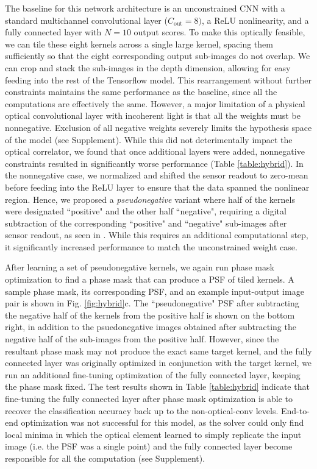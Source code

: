 \documentclass[fleqn,10pt]{wlscirep}
\begin{document}
The baseline for this network architecture is an unconstrained CNN with a standard multichannel convolutional layer ($C_\text{out} = 8)$, a ReLU nonlinearity, and a fully connected layer with $N=10$ output scores. To make this optically feasible, we can tile these eight kernels across a single large kernel, spacing them sufficiently so that the eight corresponding output sub-images do not overlap. We can crop and stack the sub-images in the depth dimension, allowing for easy feeding into the rest of the Tensorflow model. This rearrangement without further constraints maintains the same performance as the baseline, since all the computations are effectively the same. However, a major limitation of a physical optical convolutional layer with incoherent light is that all the weights must be nonnegative. Exclusion of all negative weights severely limits the hypothesis space of the model (see Supplement). While this did not deterimentally impact the optical correlator, we found that once additional layers were added, nonnegative constraints resulted in significantly worse performance (Table \ref{table:hybrid}). In the nonnegative case, we normalized and shifted the sensor readout to zero-mean before feeding into the ReLU layer to ensure that the data spanned the nonlinear region. Hence, we proposed a \textit{pseudonegative} variant where half of the kernels were designated ``positive" and the other half ``negative", requiring a digital subtraction of the corresponding ``positive" and ``negative" sub-images after sensor readout, as seen in \cite{farhat1985optical}. While this requires an additional computational step, it significantly increased performance to match the unconstrained weight case.

After learning a set of pseudonegative kernels, we again run phase mask optimization to find a phase mask that can produce a PSF of tiled kernels. A sample phase mask, its corresponding PSF, and an example input-output image pair is shown in Fig. \ref{fig:hybrid}c. The ``pseudonegative" PSF after subtracting the negative half of the kernels from the positive half is shown on the bottom right, in addition to the psuedonegative images obtained after subtracting the negative half of the sub-images from the positive half. 
However, since the resultant phase mask may not produce the exact same target kernel, and the fully connected layer was originally optimized in conjunction with the target kernel, we run an additional fine-tuning optimization of the fully connected layer, keeping the phase mask fixed. The test results shown in Table \ref{table:hybrid} indicate that fine-tuning the fully connected layer after phase mask optimization is able to recover the classification accuracy back up to the non-optical-conv levels. End-to-end optimization was not successful for this model, as the solver could only find local minima in which the optical element learned to simply replicate the input image (i.e. the PSF was a single point) and the fully connected layer become responsible for all the computation (see Supplement).
\end{document}
